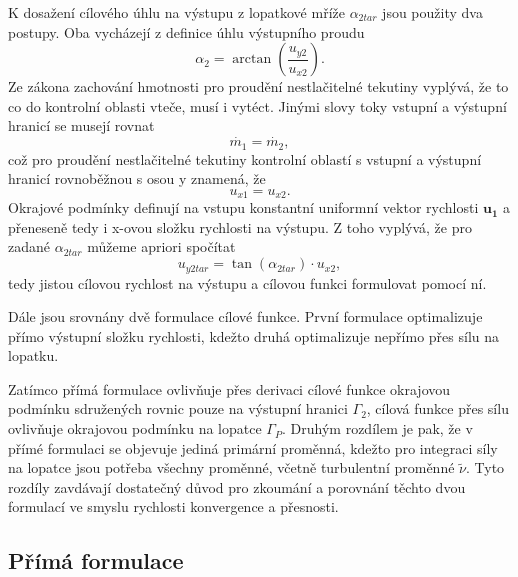 K dosažení cílového úhlu na výstupu z lopatkové mříže $ \alpha_{2tar} $ jsou použity dva postupy. Oba vycházejí z definice úhlu výstupního proudu
\begin{equation}\label{eq:alpha_tan}
\alpha_2 = \arctan\left(\dfrac{u_{y2}}{u_{x2}}\right).
\end{equation}
Ze zákona zachování hmotnosti pro proudění nestlačitelné tekutiny vyplývá, že to co do kontrolní oblasti vteče, musí i vytéct. Jinými slovy toky vstupní a výstupní hranicí se musejí rovnat
\begin{equation}
\dot{m_1}=\dot{m_2},
\end{equation}
což pro proudění nestlačitelné tekutiny kontrolní oblastí s vstupní a výstupní hranicí rovnoběžnou s osou y znamená, že 
\begin{equation}\label{eq:ux1_ux2}
u_{x1}=u_{x2}.
\end{equation}
Okrajové podmínky definují na vstupu konstantní uniformní vektor rychlosti $ \mathbf{u_1} $ a přeneseně tedy i x-ovou složku rychlosti na výstupu. Z toho vyplývá, že pro zadané $ \alpha_{2tar} $ můžeme apriori spočítat
\begin{equation}
u_{y2tar} = \tan(\alpha_{2tar}) \cdot u_{x2},
\end{equation}
tedy jistou cílovou rychlost na výstupu a cílovou funkci formulovat pomocí ní.

Dále jsou srovnány dvě formulace cílové funkce. První formulace optimalizuje přímo výstupní složku rychlosti, kdežto druhá optimalizuje nepřímo přes sílu na lopatku.

Zatímco přímá formulace ovlivňuje přes derivaci cílové funkce okrajovou podmínku sdružených rovnic pouze na výstupní hranici $ \Gamma_2 $, cílová funkce přes sílu ovlivňuje okrajovou podmínku na lopatce $ \Gamma_P $. Druhým rozdílem je pak, že v přímé formulaci se objevuje jediná primární proměnná, kdežto pro integraci síly na lopatce jsou potřeba všechny proměnné, včetně turbulentní proměnné $ \widetilde{\nu} $. Tyto rozdíly zavdávají dostatečný důvod pro zkoumání a porovnání těchto dvou formulací ve smyslu rychlosti konvergence a přesnosti.

\subsection{Přímá formulace}

